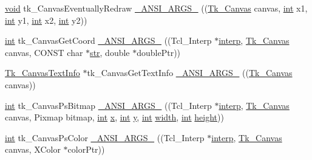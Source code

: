 \begin{DoxyCompactItemize}
\item 
\hyperlink{tk_8h_aba408b7cd755a96426e004c015f5de8e}{void} tk\+\_\+\+Canvas\+Eventually\+Redraw \hyperlink{struct_tk_stubs_a229d921edf42342fcffac2b272d24ddc}{\+\_\+\+A\+N\+S\+I\+\_\+\+A\+R\+G\+S\+\_\+} ((\hyperlink{tk_8h_a48928ad64693bd6179f628ad883f3250}{Tk\+\_\+\+Canvas} canvas, \hyperlink{tk_8h_a83f82f76e7fed06f4c49d2db94028a6d}{int} x1, \hyperlink{tk_8h_a83f82f76e7fed06f4c49d2db94028a6d}{int} y1, \hyperlink{tk_8h_a83f82f76e7fed06f4c49d2db94028a6d}{int} x2, \hyperlink{tk_8h_a83f82f76e7fed06f4c49d2db94028a6d}{int} y2))
\item 
\hyperlink{tk_8h_a83f82f76e7fed06f4c49d2db94028a6d}{int} tk\+\_\+\+Canvas\+Get\+Coord \hyperlink{struct_tk_stubs_a511fed2094bb2442af2f1a54e8be5c51}{\+\_\+\+A\+N\+S\+I\+\_\+\+A\+R\+G\+S\+\_\+} ((Tcl\+\_\+\+Interp $\ast$\hyperlink{tk_8h_a5ab79c0f5849ee8e6a2e955a6c536cc0}{interp}, \hyperlink{tk_8h_a48928ad64693bd6179f628ad883f3250}{Tk\+\_\+\+Canvas} canvas, C\+O\+N\+ST char $\ast$\hyperlink{morph_8c_ab50d783982593ef993ea0b68f7ad8b80}{str}, double $\ast$double\+Ptr))
\item 
\hyperlink{struct_tk___canvas_text_info}{Tk\+\_\+\+Canvas\+Text\+Info} $\ast$tk\+\_\+\+Canvas\+Get\+Text\+Info \hyperlink{struct_tk_stubs_a5b0a45dc44d8c42a206758e3a5b27c13}{\+\_\+\+A\+N\+S\+I\+\_\+\+A\+R\+G\+S\+\_\+} ((\hyperlink{tk_8h_a48928ad64693bd6179f628ad883f3250}{Tk\+\_\+\+Canvas} canvas))
\item 
\hyperlink{tk_8h_a83f82f76e7fed06f4c49d2db94028a6d}{int} tk\+\_\+\+Canvas\+Ps\+Bitmap \hyperlink{struct_tk_stubs_a5d4ea4bd178ae35e015bab9b895af93e}{\+\_\+\+A\+N\+S\+I\+\_\+\+A\+R\+G\+S\+\_\+} ((Tcl\+\_\+\+Interp $\ast$\hyperlink{tk_8h_a5ab79c0f5849ee8e6a2e955a6c536cc0}{interp}, \hyperlink{tk_8h_a48928ad64693bd6179f628ad883f3250}{Tk\+\_\+\+Canvas} canvas, Pixmap bitmap, \hyperlink{tk_8h_a83f82f76e7fed06f4c49d2db94028a6d}{int} \hyperlink{tk_8h_a61ebd54d47cc56787649a3b8f126bda1}{x}, \hyperlink{tk_8h_a83f82f76e7fed06f4c49d2db94028a6d}{int} \hyperlink{tk_8h_a40f4f3601c0eaa8ca46b1a164264696d}{y}, \hyperlink{tk_8h_a83f82f76e7fed06f4c49d2db94028a6d}{int} \hyperlink{tk_8h_a29e50a5401c1396b3a2aa3487f74d468}{width}, \hyperlink{tk_8h_a83f82f76e7fed06f4c49d2db94028a6d}{int} \hyperlink{tk_8h_a67be2f4b9d9c5b3559139bfb072e2e81}{height}))
\item 
\hyperlink{tk_8h_a83f82f76e7fed06f4c49d2db94028a6d}{int} tk\+\_\+\+Canvas\+Ps\+Color \hyperlink{struct_tk_stubs_a95b9b6153f54a7f4ed50220fb119ef98}{\+\_\+\+A\+N\+S\+I\+\_\+\+A\+R\+G\+S\+\_\+} ((Tcl\+\_\+\+Interp $\ast$\hyperlink{tk_8h_a5ab79c0f5849ee8e6a2e955a6c536cc0}{interp}, \hyperlink{tk_8h_a48928ad64693bd6179f628ad883f3250}{Tk\+\_\+\+Canvas} canvas, X\+Color $\ast$color\+Ptr))

\end{DoxyCompactItemize}
